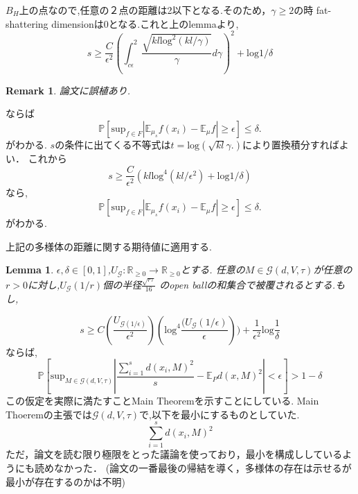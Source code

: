 \documentclass{jarticle}
\newtheorem{lem}[thm]{Lemma}
\newtheorem*{rem}{Remark}
\begin{document}
$B_H$上の点なので,任意の２点の距離は2以下となる.そのため，$\gamma \ge 2$の時
fat-shattering dimensionは0となる.これと上のlemmaより,
\begin{equation*}
 s \ge \frac{C}{\epsilon^2} (\int_{c \epsilon}^2 \frac{\sqrt{kl \mathrm{log}^2 (kl/\gamma)}}{\gamma}d \gamma)^2 + \mathrm{log}1/\delta
\end{equation*}
\begin{rem}
 論文に誤植あり.
\end{rem}
ならば
\begin{equation*}
 \mathbb{P}[ \mathrm{sup}_{f \in F} |\mathbb{E}_{\mu_s}f(x_i) -\mathbb{E}_{\mu}f|  \ge \epsilon] \le \delta.
\end{equation*}
がわかる.
$s$の条件に出てくる不等式は$t= \mathrm{log}(\sqrt{kl}{\gamma}.)$により置換積分すればよい．
これから
\begin{equation*}
  s \ge \frac{C}{\epsilon^2}(kl \mathrm{log}^4(kl/\epsilon^2) + \mathrm{log}1/\delta)
\end{equation*}
なら,
\begin{equation*}
 \mathbb{P}[ \mathrm{sup}_{f \in F} |\mathbb{E}_{\mu_s}f(x_i) -\mathbb{E}_{\mu}f|  \ge \epsilon] \le \delta.
\end{equation*}
がわかる.

上記の多様体の距離に関する期待値に適用する.
\begin{lem}
\label{mfdvar}
$\epsilon,\delta \in [0,1]$,$U_{\mathcal{G}}:\mathbb{R}_{\ge 0} \to \mathbb{R}_{\ge 0}$とする.
任意の$M \in \mathcal{G}(d,V,\tau)$が任意の$r >0$に対し,$U_{\mathcal{G}}(1/r)$個の半径$\frac{\sqrt{r \tau}}{16}$
のopen ballの和集合で被覆されるとする.もし,
\end{lem}
\begin{equation*}
 s \ge C (\frac{U_{\mathcal{G}(1/\epsilon) }}{\epsilon^2})(\mathrm{log}^4 \frac{(U_{\mathcal{G}}(1/\epsilon)}{\epsilon})) + \frac{1}{\epsilon^2}
 \mathrm{log}\frac{1}{\delta}
\end{equation*}
ならば,
\begin{equation*}
 \mathbb{P}[\mathrm{sup}_{M \in \mathcal{G}(d,V,\tau)} | \frac{\sum_{i=1}^s d(x_i,M)^2}{s} - \mathbb{E}_Pd(x,M)^2 | < \epsilon ]  > 1 - \delta
\end{equation*}
この仮定を実際に満たすことMain Theoremを示すことにしている.
Main Thoeremの主張では$\mathcal{G}(d,V,\tau)$で,以下を最小にするものとしていた.
\begin{equation*}
 \sum_{i=1}^sd(x_i,M)^2
\end{equation*}
ただ，論文を読む限り極限をとった議論を使っており，最小を構成ししているようにも読めなかった．
(論文の一番最後の帰結を導く，多様体の存在は示せるが最小が存在するのかは不明)
\end{document}
